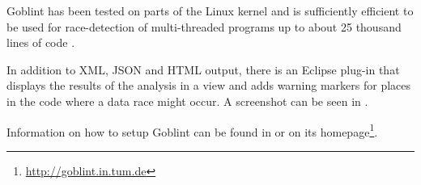 Goblint has been tested on parts of the Linux kernel and is sufficiently efficient to be used for race-detection of multi-threaded programs up to about 25 thousand lines of code \cite{Vojdani10Thesis,goblint.pdf}.

In addition to XML, JSON and HTML output, there is an Eclipse plug-in that displays the results of the analysis in a view and adds warning markers for places in the code where a data race might occur. A screenshot can be seen in .

Information on how to setup Goblint can be found in  or on its homepage\footnote{\url{http://goblint.in.tum.de}}.



